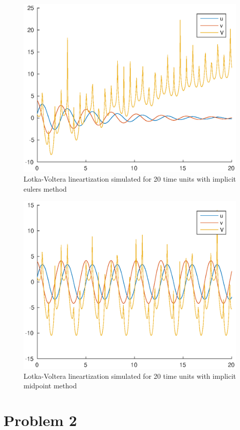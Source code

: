 \documentclass[11pt]{article}
\begin{document}
\begin{figure}[h!]
\centering
\includegraphics[width=.8\textwidth]{LV_ieu.eps}
\caption{Lotka-Voltera lineartization simulated for 20 time units with implicit eulers method}
\label{fig:LV_ieu}
\end{figure}

\begin{figure}[h!]
\centering
\includegraphics[width=.8\textwidth]{LV_imp.eps}
\caption{Lotka-Voltera lineartization simulated for 20 time units with implicit midpoint method}
\label{fig:LV_imp}
\end{figure}

\section*{Problem 2}
\end{document}
